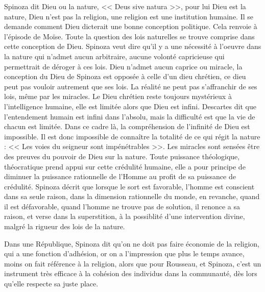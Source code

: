 \documentclass[11pt]{article}
\begin{document}
Spinoza dit Dieu ou la nature, << Deus sive natura >>, pour lui Dieu est la nature, Dieu n'est pas la religion, une religion est une institution humaine. Il se demande comment Dieu dicterait une bonne conception politique. Cela renvoie à l'épisode de Moïse. Toute la question des lois naturelles se trouve comprise dans cette conception de Dieu. Spinoza veut dire qu'il y a une nécessité à l'oeuvre dans la nature qui n'admet aucun arbitraire, aucune volonté capricieuse qui permettrait de déroger à ces lois. Dieu n'admet aucun caprice ou miracle, la conception du Dieu de Spinoza est opposée à celle d'un dieu chrétien, ce dieu peut pas vouloir autrement que ses lois. La réalité ne peut pas s'affranchir de ses lois, même par les miracles. Le Dieu chrétien reste toujours mystérieux à l'intelligence humaine, elle est limitée alors que Dieu est infini. Descartes dit que l'entendement humain est infini dans l'absolu, mais la difficulté est que la vie de chacun est limitée. Dans ce cadre là, la compréhension de l'infinité de Dieu est impossible. Il est donc impossible de connaître la totalité de ce qui régit la nature : << Les voies du seigneur sont impénétrables >>. Les miracles sont sensées être des preuves du pouvoir de Dieu sur la nature. Toute puissance théologique, théocratique prend appui sur cette crédulité humaine, elle a pour principe de diminuer la puissance rationnelle de l'Homme au profit de sa puissance de crédulité. Spinoza décrit que lorsque le sort est favorable, l'homme est conscient dans sa seule raison, dans la dimension rationnelle du monde, en revanche, quand il est défavorable, quand l'homme ne trouve pas de solution, il renonce a sa raison, et verse dans la superstition, à la possiblité d'une intervention divine, malgré la rigueur des lois de la nature.

Dans une République, Spinoza dit qu'on ne doit pas faire économie de la religion, qui a une fonction d'adhésion, or on a l'impression que plus le temps avance, moins on fait référence à la religion, alors que pour Rousseau, et Spinoza, c'est un instrument très efficace à la cohésion des individus dans la communauté, dès lors qu'elle respecte sa juste place.  
\end{document}

